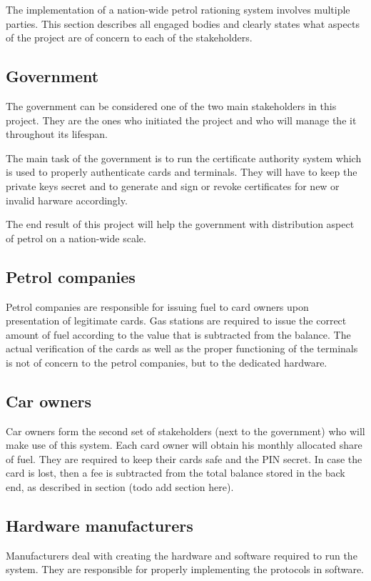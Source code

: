 The implementation of a nation-wide petrol rationing system involves multiple parties. This section describes all engaged bodies and clearly states what aspects of the project are of concern to each of the stakeholders.

\subsection{Government}

The government can be considered one of the two main stakeholders in this project. They are the ones who initiated the project and who will manage the it throughout its lifespan.

The main task of the government is to run the certificate authority system which is used to properly authenticate cards and terminals. They will have to keep the private keys secret and to generate and sign or revoke certificates for new or invalid harware accordingly.

The end result of this project will help the government with distribution aspect of petrol on a nation-wide scale.

\subsection{Petrol companies}

Petrol companies are responsible for issuing fuel to card owners upon presentation of legitimate cards. Gas stations are required to issue the correct amount of fuel according to the value that is subtracted from the balance. The actual verification of the cards as well as the proper functioning of the terminals is not of concern to the petrol companies, but to the dedicated hardware.

\subsection{Car owners}

Car owners form the second set of stakeholders (next to the government) who will make use of this system. Each card owner will obtain his monthly allocated share of fuel. They are required to keep their cards safe and the PIN secret. In case the card is lost, then a fee is subtracted from the total balance stored in the back end, as described in section (todo add section here).

\subsection{Hardware manufacturers}

Manufacturers deal with creating the hardware and software required to run the system. They are responsible for properly implementing the protocols in software.